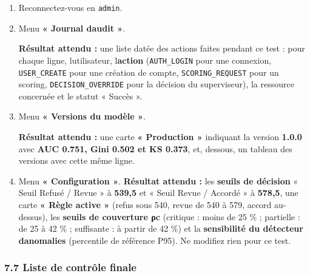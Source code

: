\documentclass[
  french,
  11pt,
  a4paper,
]{article}
\begin{document}
\begin{enumerate}
\def\labelenumi{\arabic{enumi}.}
\item
  Reconnectez-vous en \texttt{admin}.
\item
  Menu \textbf{« Journal d\textquotesingle audit »}.

  \textbf{Résultat attendu :} une liste datée des actions faites pendant
  ce test : pour chaque ligne, l\textquotesingle utilisateur,
  l\textquotesingle{}\textbf{action} (\texttt{AUTH\_LOGIN} pour une
  connexion, \texttt{USER\_CREATE} pour une création de compte,
  \texttt{SCORING\_\allowbreak{}REQUEST} pour un scoring,
  \texttt{DECISION\_\allowbreak{}OVERRIDE} pour la décision du
  superviseur), la ressource concernée et le statut « Succès ».
\item
  Menu \textbf{« Versions du modèle »}.

  \textbf{Résultat attendu :} une carte \textbf{« Production »}
  indiquant la version \textbf{1.0.0} avec \textbf{AUC 0.751, Gini 0.502
  et KS 0.373}, et, dessous, un tableau des versions avec cette même
  ligne.
\item
  Menu \textbf{« Configuration »}. \textbf{Résultat attendu :} les
  \textbf{seuils de décision} « Seuil Refusé / Revue » à \textbf{539,5}
  et « Seuil Revue / Accordé » à \textbf{578,5}, une carte \textbf{«
  Règle active »} (refus sous 540, revue de 540 à 579, accord
  au-dessus), les \textbf{seuils de couverture ρc} (critique : moins de
  25 \% ; partielle : de 25 à 42 \% ; suffisante : à partir de 42 \%) et
  la \textbf{sensibilité du détecteur d\textquotesingle anomalies}
  (percentile de référence P95). Ne modifiez rien pour ce test.
\end{enumerate}

\subsubsection{7.7 Liste de contrôle
finale}\label{77-liste-de-contruxf4le-finale}
\end{document}
